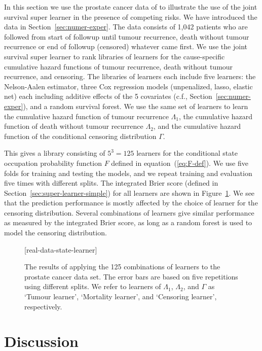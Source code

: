 \documentclass[lineno]{biometrika}
\newcommand{\1}{\mathds{1}}
\begin{document}
In this section we use the prostate cancer data of
\cite{kattan2000pretreatment} to illustrate the use of the joint
survival super learner in the presence of competing risks. We have
introduced the data in Section~\ref{sec:numer-exper}. The data
consists of 1,042 patients who are followed from start of followup
until tumour recurrence, death without tumour recurrence or end of
followup (censored) whatever came first. We use the joint survival
super learner to rank libraries of learners for the cause-specific
cumulative hazard functions of tumour recurrence, death without tumour
recurrence, and censoring. The libraries of learners each include five
learners: the Nelson-Aalen estimator, three Cox regression models
(unpenalized, lasso, elastic net) each including additive effects of
the 5 covariates (c.f., Section~\ref{sec:numer-exper}), and a random
survival forest. We use the same set of learners to learn the
cumulative hazard function of tumour recurrence \( \Lambda_1 \), the
cumulative hazard function of death without tumour recurrence
\( \Lambda_2 \), and the cumulative hazard function of the conditional
censoring distribution $\Gamma$.

This gives a library consisting of \( 5^3 = 125 \) learners for the
conditional state occupation probability function \( F \) defined in
equation~(\ref{eq:F-def}). We use five folds for training and testing
the models, and we repeat training and evaluation five times with
different splits.  The integrated Brier score (defined in
Section~\ref{sec:super-learner-simple}) for all learners are shown in
Figure~\ref{fig:zelefski-real}. We see that the prediction
performance is mostly affected by the choice of learner for the
censoring distribution. Several combinations of learners give similar
performance as measured by the integrated Brier score, as long as a
random forest is used to model the censoring distribution.

\begin{figure}
\figurebox{20pc}{25pc}{}[real-data-state-learner]
\caption{The results of applying the 125 combinations of learners to the
    prostate cancer data set. The error bars are based on five repetitions using
    different splits. We refer to learners of \( \Lambda_1 \), \( \Lambda_2 \),
    and $\Gamma$ as `Tumour learner', `Mortality learner', and `Censoring
    learner', respectively.}
\label{fig:zelefski-real}
\end{figure}


\section{Discussion}
\label{sec:discussion}
\end{document}

